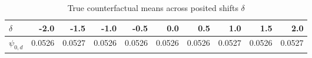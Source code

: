 \begin{table}[H]
\centering
\def\~{\hphantom{0}}
\begin{minipage}{175mm}
\caption{\label{tab:table:hvtn_null_truths}True counterfactual means across
   posited shifts $\delta$}
\begin{tabular}[t]{l|r|r|r|r|r|r|r|r|r}
\hline
$\delta$ & -2.0 & -1.5 & -1.0 & -0.5 & 0.0 & 0.5 & 1.0 & 1.5 & 2.0\\
\hline
$\psi_{0,d}$ & 0.0526 & 0.0527 & 0.0526 & 0.0526 & 0.0526 & 0.0526 & 0.0527 & 0.0526 & 0.0527\\
\hline
\end{tabular}
\end{minipage}
\vspace*{-6pt}
\end{table}
